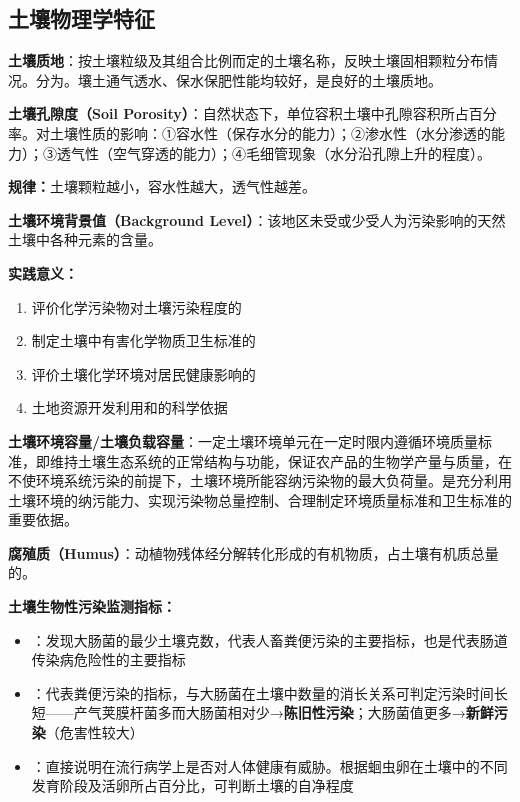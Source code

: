\documentclass[10pt,a4paper,oneside]{ctexbook}
\begin{document}
\subsection{土壤物理学特征}

\begin{defbox}
\textbf{土壤质地}：按土壤粒级及其组合比例而定的土壤名称，反映土壤固相颗粒分布情况。分为。壤土通气透水、保水保肥性能均较好，是良好的土壤质地。

\textbf{土壤孔隙度（Soil Porosity）}：自然状态下，单位容积土壤中孔隙容积所占百分率。对土壤性质的影响：①容水性（保存水分的能力）；②渗水性（水分渗透的能力）；③透气性（空气穿透的能力）；④毛细管现象（水分沿孔隙上升的程度）。

\textbf{规律：}土壤颗粒越小，容水性越大，透气性越差。
\end{defbox}

\begin{keybox}
\textbf{土壤环境背景值（Background Level）}：该地区未受或少受人为污染影响的天然土壤中各种元素的含量。

\textbf{实践意义：}
\begin{enumerate}[leftmargin=*]
    \item 评价化学污染物对土壤污染程度的
    \item 制定土壤中有害化学物质卫生标准的
    \item 评价土壤化学环境对居民健康影响的
    \item 土地资源开发利用和的科学依据
\end{enumerate}
\end{keybox}

\begin{defbox}
\textbf{土壤环境容量/土壤负载容量}：一定土壤环境单元在一定时限内遵循环境质量标准，即维持土壤生态系统的正常结构与功能，保证农产品的生物学产量与质量，在不使环境系统污染的前提下，土壤环境所能容纳污染物的最大负荷量。是充分利用土壤环境的纳污能力、实现污染物总量控制、合理制定环境质量标准和卫生标准的重要依据。

\textbf{腐殖质（Humus）}：动植物残体经分解转化形成的有机物质，占土壤有机质总量的。
\end{defbox}

\begin{tipbox}
\textbf{土壤生物性污染监测指标：}
\begin{itemize}[leftmargin=*]
    \item {}：发现大肠菌的最少土壤克数，代表人畜粪便污染的主要指标，也是代表肠道传染病危险性的主要指标
    \item {}：代表粪便污染的指标，与大肠菌在土壤中数量的消长关系可判定污染时间长短——产气荚膜杆菌多而大肠菌相对少→\textbf{陈旧性污染}；大肠菌值更多→\textbf{新鲜污染}（危害性较大）
    \item {}：直接说明在流行病学上是否对人体健康有威胁。根据蛔虫卵在土壤中的不同发育阶段及活卵所占百分比，可判断土壤的自净程度
\end{itemize}
\end{tipbox}
\end{document}
